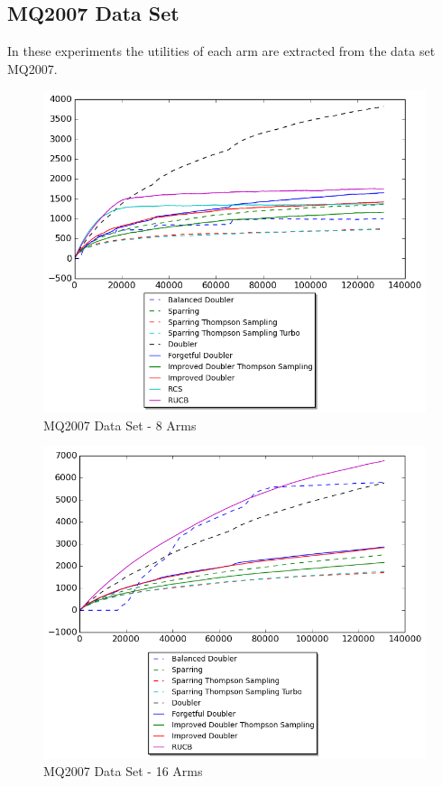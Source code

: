 \documentclass[MSc,beforeExam]{iitcsthesis}
\begin{document}
\subsection{MQ2007 Data Set}
In these experiments the utilities of each arm are extracted from the data set MQ2007. 
\begin{figure}[h!]
\centering
  \includegraphics[scale=0.8]{graphs/real_data_8.png}
  \caption{MQ2007 Data Set - 8 Arms}
\end{figure}
\newpage
\begin{figure}[h!]
\centering
  \includegraphics[scale=0.8]{graphs/real_data_16.png}
  \caption{MQ2007 Data Set - 16 Arms}
\end{figure}
\end{document}
